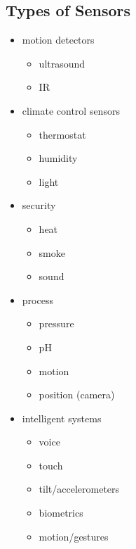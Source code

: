 \documentclass[11pt]{article}
\begin{document}
\subsection{Types of Sensors}
\label{sec:org2c92e9f}
\begin{itemize}
\item motion detectors
\begin{itemize}
\item ultrasound
\item IR
\end{itemize}
\item climate control sensors
\begin{itemize}
\item thermostat
\item humidity
\item light
\end{itemize}
\item security
\begin{itemize}
\item heat
\item smoke
\item sound
\end{itemize}
\item process
\begin{itemize}
\item pressure
\item pH
\item motion
\item position (camera)
\end{itemize}
\item intelligent systems
\begin{itemize}
\item voice
\item touch
\item tilt/accelerometers
\item biometrics
\item motion/gestures
\end{itemize}
\end{itemize}
\end{document}
